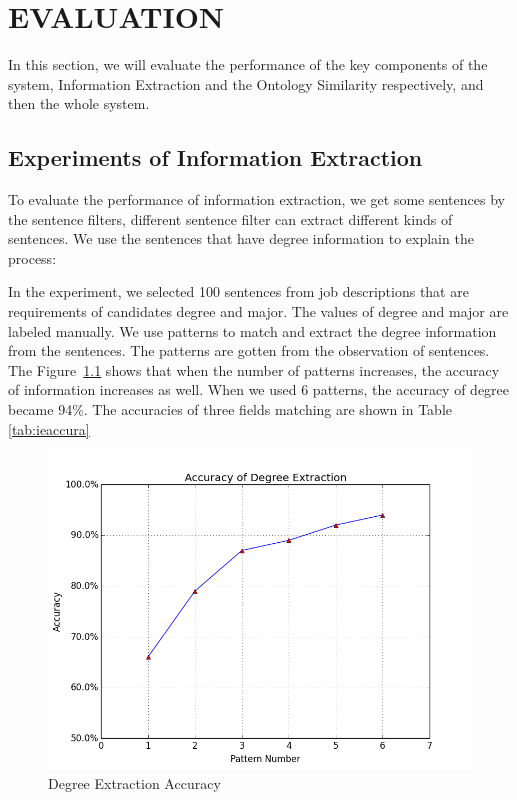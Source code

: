 \chapter{EVALUATION}

In this section, we will evaluate the performance of the key components of the system, Information Extraction and the Ontology Similarity respectively, and then the whole system.

\section{Experiments of Information Extraction }

To evaluate the performance of information extraction, we get some sentences by the sentence filters, different sentence filter can extract different kinds of sentences. We use the sentences that have degree information to explain the process:

In the experiment, we selected 100 sentences from job descriptions that are requirements of candidates degree and major. The values of degree and major are labeled manually. We use patterns to  match and extract the degree information from the sentences. The patterns are gotten from the observation of sentences. The Figure~\ref{fig:degree_accuracy} shows that when the number of  patterns increases, the accuracy of information increases as well. When we used 6 patterns, the accuracy of degree became 94\%. The accuracies of three fields matching are shown in Table \ref{tab:ieaccura}

\begin{figure}[htbp]
  \centering
  \includegraphics[scale=0.5]{images/degree_accuracy.png}
  \caption{Degree Extraction  Accuracy}
  \label{fig:degree_accuracy}
\end{figure}



